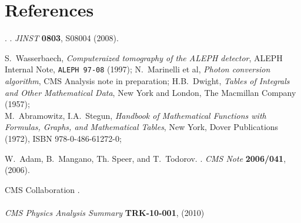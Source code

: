 \documentclass[a4paper]{jpconf}
\def\Journal#1#2#3#4{{#1} {\bf #2}, #3 (#4)}
\begin{document}
\section*{References}

\begin{thebibliography}{99}


.
.
\Journal{\em JINST}{0803}{S08004}{2008}.

 S.~Wasserbaech, {\em Computeraized tomography of the
    ALEPH detector}, ALEPH Internal Note, {\tt ALEPH 97-08} (1997);
 N.~Marinelli et al, {\em Photon conversion algorithm},
  CMS Analysis note in preparation;
 H.B.~Dwight, {\em Tables of Integrals and Other
    Mathematical Data}, New York and London, The Macmillan Company (1957);\\
  M.~Abramowitz, I.A.~Stegun, {\em Handbook of Mathematical
  Functions with Formulas, Graphs, and Mathematical Tables}, New York,
  Dover Publications (1972), ISBN 978-0-486-61272-0;


W.~Adam, B.~Mangano, Th. Speer, and T.~Todorov.
.
\Journal {\em CMS Note}{2006/041}{}{2006}.


{CMS Collaboration}
.
\\
\\
\Journal{\em CMS Physics Analysis Summary}{TRK-10-001}{}{2010}


\end{thebibliography}
\end{document}
